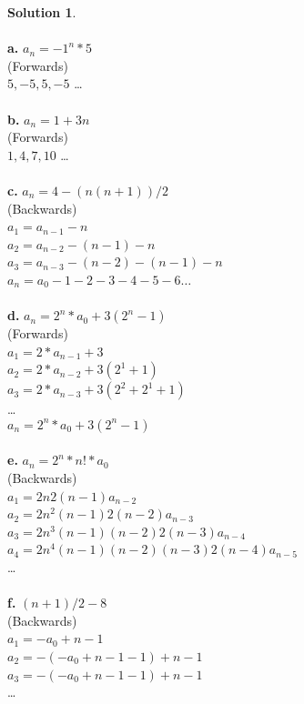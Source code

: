 \documentclass{article}
\theoremstyle{definition}
\newtheorem*{solution}{Solution}
\begin{document}
\begin{solution}\ \\
\ \\
\textbf{a.} $a_n = -1^n * 5$\ \\ (Forwards)\ \\ $5,-5,5,-5$ \dots\ \\
\ \\
\textbf{b.} $a_n = 1 + 3n $\ \\ (Forwards)\ \\ $1,4,7,10$ \dots\ \\
\ \\
\textbf{c.} $a_n = 4 - (n(n+1))/2 $\ \\ (Backwards) \ \\
$a_1 = a_{n-1} - n$\ \\ $a_2 = a_{n-2} -(n-1) - n$\ \\
$a_3 = a_{n-3} - (n-2) - (n-1) - n$\ \\
$a_n = a_{0} - 1 -2 - 3 - 4 - 5 - 6 \dots$\ \\
\ \\
\textbf{d.} $a_n = 2^n * a_0 + 3(2^n - 1)$\ \\ (Forwards) \ \\
$a_1 = 2 * a_{n-1} + 3$\ \\
$a_2 = 2 * a_{n-2} + 3(2^1 + 1)$\ \\
$a_3 = 2 * a_{n-3} + 3(2^2 + 2^1 + 1)$\ \\
\dots \ \\ $a_n = 2^n * a_0 + 3(2^n - 1)$\\\
\ \\
\textbf{e.} $a_n = 2^n * n! * a_0$\ \\ (Backwards)\ \\
$a_1 = 2n2(n-1)a_{n-2}$\ \\
$a_2 = 2n^2(n-1)2(n-2)a_{n-3}$\ \\
$a_3 = 2n^3(n-1)(n-2)2(n-3)a_{n-4}$\ \\
$a_4 = 2n^4(n-1)(n-2)(n-3)2(n-4)a_{n-5}$\ \\
\dots\ \\
\ \\
\textbf{f.} $(n+1)/2 - 8$\ \\ (Backwards) \ \\
$a_1 = -a_0 + n-1$\ \\
$a_2 = -(-a_0 + n-1 - 1) + n - 1$\ \\
$a_3 = -(-a_0 + n-1 - 1) + n - 1$\ \\
\dots\ \\


\end{solution}
\end{document}
